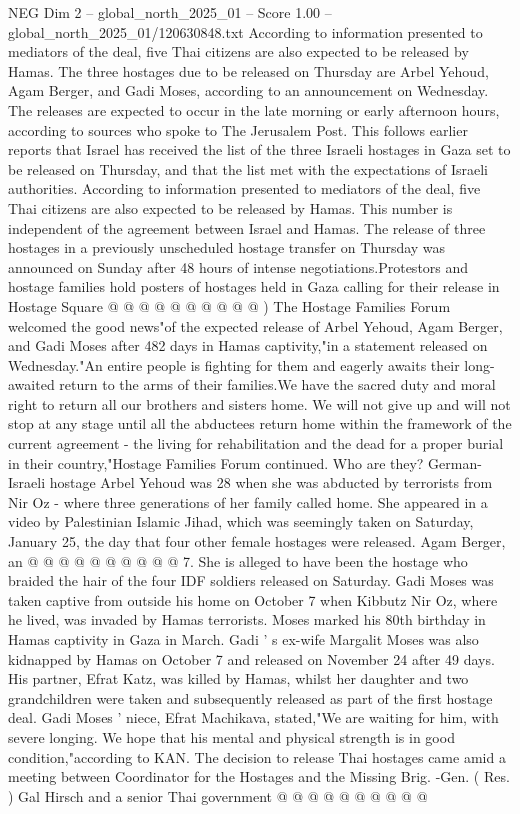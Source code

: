 \begin{textsample}{NEG Dim 2 – global\_north\_2025\_01 – Score 1.00 – global\_north\_2025\_01/120630848.txt}  \label{ex:f2_neg_083}
According to information presented to mediators of the deal, five Thai citizens are also expected to be released by Hamas.
The three hostages due to be released on Thursday are Arbel Yehoud, Agam Berger, and Gadi Moses, according to an announcement on Wednesday.
The releases are expected to occur in the late morning or early afternoon hours, according to sources who spoke to The Jerusalem Post.
This follows earlier reports that Israel has received the list of the three Israeli hostages in Gaza set to be released on Thursday, and that the list met with the expectations of Israeli authorities.
According to information presented to mediators of the deal, five Thai citizens are also expected to be released by Hamas.
This number is independent of the agreement between Israel and Hamas.
The release of three hostages in a previously unscheduled hostage transfer on Thursday was announced on Sunday after 48 hours of intense negotiations.Protestors and hostage families hold posters of hostages held in Gaza calling for their release in Hostage Square @ @ @ @ @ @ @ @ @ @ ) The Hostage Families Forum welcomed the good news"of the expected release of Arbel Yehoud, Agam Berger, and Gadi Moses after 482 days in Hamas captivity,"in a statement released on Wednesday."An entire people is fighting for them and eagerly awaits their long-awaited return to the arms of their families.We have the sacred duty and moral right to return all our brothers and sisters home.
We will not give up and will not stop at any stage until all the abductees return home within the framework of the current agreement - the living for rehabilitation and the dead for a proper burial in their country,"Hostage Families Forum continued.
Who are they?
German-Israeli hostage Arbel Yehoud was 28 when she was abducted by terrorists from Nir Oz - where three generations of her family called home.
She appeared in a video by Palestinian Islamic Jihad, which was seemingly taken on Saturday, January 25, the day that four other female hostages were released.
Agam Berger, an @ @ @ @ @ @ @ @ @ @ 7.
She is alleged to have been the hostage who braided the hair of the four IDF soldiers released on Saturday.
Gadi Moses was taken captive from outside his home on October 7 when Kibbutz Nir Oz, where he lived, was invaded by Hamas terrorists.
Moses marked his 80th birthday in Hamas captivity in Gaza in March.
Gadi ' s ex-wife Margalit Moses was also kidnapped by Hamas on October 7 and released on November 24 after 49 days.
His partner, Efrat Katz, was killed by Hamas, whilst her daughter and two grandchildren were taken and subsequently released as part of the first hostage deal.
Gadi Moses ' niece, Efrat Machikava, stated,"We are waiting for him, with severe longing.
We hope that his mental and physical strength is in good condition,"according to KAN.
The decision to release Thai hostages came amid a meeting between Coordinator for the Hostages and the Missing Brig. -Gen. ( Res. ) Gal Hirsch and a senior Thai government @ @ @ @ @ @ @ @ @ @

\end{textsample}
